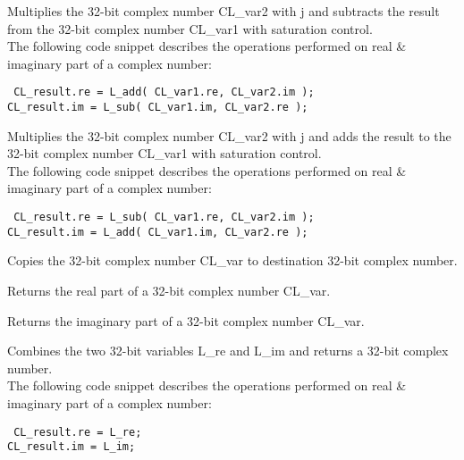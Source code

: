 
Multiplies the 32-bit complex number CL\_var2 with j and subtracts the result from the 32-bit complex number CL\_var1 with saturation control.\\
The following code snippet describes the operations performed on real \& imaginary part of a complex number:

{\tt {} CL\_result.re = L\_add( CL\_var1.re, CL\_var2.im );\\
 CL\_result.im = L\_sub( CL\_var1.im, CL\_var2.re );
}


Multiplies the 32-bit complex number CL\_var2 with j and adds the result to the 32-bit complex number CL\_var1 with saturation control.\\
The following code snippet describes the operations performed on real \& imaginary part of a complex number:

{\tt {} CL\_result.re = L\_sub( CL\_var1.re, CL\_var2.im );\\
 CL\_result.im = L\_add( CL\_var1.im, CL\_var2.re );
}


Copies the 32-bit complex number CL\_var to destination 32-bit complex number.


Returns the real part of a 32-bit complex number CL\_var.


Returns the imaginary part of a 32-bit complex number CL\_var.


Combines the two 32-bit variables L\_re and L\_im and returns a 32-bit complex number.\\
The following code snippet describes the operations performed on real \& imaginary part of a complex number:

{\tt {} CL\_result.re = L\_re;\\
 CL\_result.im = L\_im;
}

